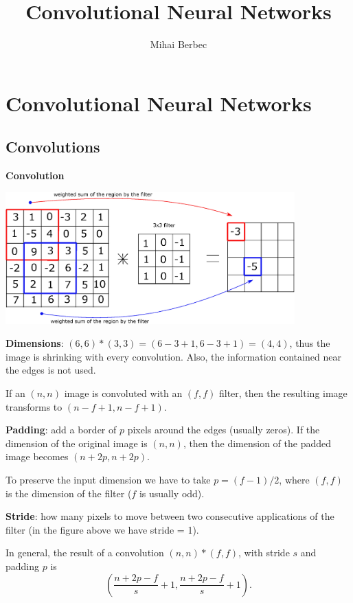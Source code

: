 \documentclass[a4paper,11pt]{report}
\begin{document}
\title{Convolutional Neural Networks}
\author{Mihai Berbec}
\maketitle

\chapter{Convolutional Neural Networks}

\section{Convolutions}

\textbf{Convolution}

\begin{center}
\includegraphics[height = 2in]{convolutions/convdef}
\end{center}

\textbf{Dimensions}: $(6, 6) * (3, 3) = (6-3+1, 6-3+1) = (4, 4)$, thus the image is shrinking with every convolution. Also, the information contained near the edges is not used.

If an $(n, n)$ image is convoluted with an $(f, f)$ filter, then the resulting image transforms \linebreak to $(n-f+1, n-f+1)$.

\textbf{Padding}: add a border of $p$ pixels around the edges (usually zeros). If the dimension of the original image is $(n, n)$, then the dimension of the padded image becomes $(n+2p, n+2p)$.

To preserve the input dimension we have to take $p = (f-1)/2$, where $(f, f)$ is the dimension of the filter ($f$ is usually odd).

\textbf{Stride}: how many pixels to move between two consecutive applications of the filter (in the figure above we have stride = 1).

In general, the result of a convolution $(n, n) * (f, f)$, with stride $s$ and padding $p$ is $$\left(\dfrac{n+2p-f}{s} + 1, \dfrac{n+2p-f}{s} + 1\right).$$
\end{document}
